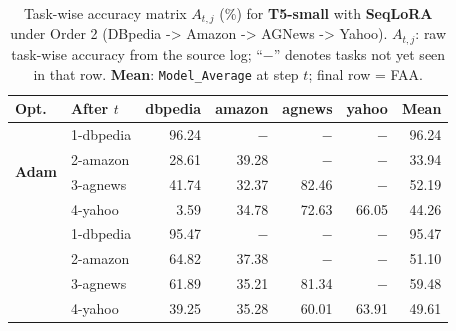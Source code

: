 \begin{table}[ht]
\centering
\caption{%
  Task-wise accuracy matrix $A_{t,j}$ (\%) for \textbf{T5-small} with \textbf{SeqLoRA} under Order 2 (DBpedia -> Amazon -> AGNews -> Yahoo).
  $A_{t,j}$: raw task-wise accuracy from the source log; ``$-$'' denotes tasks not yet seen in that row.
  \textbf{Mean}: \texttt{Model\_Average} at step $t$; final row = FAA.
}
\label{tab:nlp_o2_t5small_seqlora}
\setlength{\tabcolsep}{4.0pt}
\renewcommand{\arraystretch}{0.92}
\scriptsize
\begin{tabular}{@{}l l r r r r r@{}}
\toprule
\textbf{Opt.} & \textbf{After $t$} & \textbf{dbpedia} & \textbf{amazon} & \textbf{agnews} & \textbf{yahoo} & \textbf{Mean} \\
\midrule
\multirow{4}{*}{\textbf{Adam}} & 1-dbpedia & 96.24 & $-$ & $-$ & $-$ & 96.24 \\
 & 2-amazon & 28.61 & 39.28 & $-$ & $-$ & 33.94 \\
 & 3-agnews & 41.74 & 32.37 & 82.46 & $-$ & 52.19 \\
 & 4-yahoo & 3.59 & 34.78 & 72.63 & 66.05 & 44.26 \\
\addlinespace[2pt]
\multirow{4}{*}{\textbf{SAM}} & 1-dbpedia & 95.47 & $-$ & $-$ & $-$ & 95.47 \\
 & 2-amazon & 64.82 & 37.38 & $-$ & $-$ & 51.10 \\
 & 3-agnews & 61.89 & 35.21 & 81.34 & $-$ & 59.48 \\
 & 4-yahoo & 39.25 & 35.28 & 60.01 & 63.91 & 49.61 \\
\bottomrule
\end{tabular}
\end{table}

